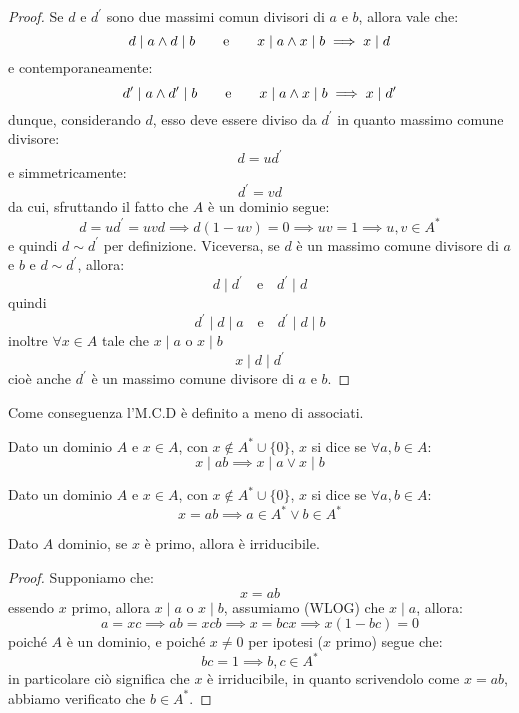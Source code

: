 \documentclass[11pt]{scrartcl}
\begin{document}
\begin{proof}
Se $d$ e $d^{\prime}$ sono due massimi comun divisori di $a$ e $b$, allora vale che:
        \[ d \mid a \land d \mid b
        \qquad
        \text e
        \qquad
        x \mid a \land x \mid b \implies x \mid d
            \]
    e contemporaneamente:
        \[ d^{\prime} \mid a \land d^{\prime} \mid b
        \qquad
        \text e
        \qquad
        x \mid a \land x \mid b \implies x \mid d^{\prime}
            \]
    dunque, considerando $d$, esso deve essere diviso da $d^{\prime}$ in quanto massimo comune divisore:
        \[ d = ud^{\prime}
            \]
    e simmetricamente:
        \[ d^{\prime} = vd
            \]
    da cui, sfruttando il fatto che $A$ è un dominio segue:
        \[ d = ud^{\prime} = uvd \implies d(1-uv) = 0 \implies uv = 1 \implies u,v \in A^*
            \]
    e quindi $d \sim d^{\prime}$ per definizione.
    Viceversa, se $d$ è un massimo comune divisore di $a$ e $b$ e $d \sim d^{\prime}$, allora:
    	\[ d \mid d^{\prime} \quad \text{e} \quad d^{\prime} \mid d
   	    \]
    quindi
    	\[ d^{\prime} \mid d \mid a \quad \text{e} \quad d^{\prime} \mid d \mid b
   	    \]
    inoltre $\forall x \in A$ tale che $x \mid a$ o $x \mid b$
    	\[ x \mid d \mid d^{\prime}
   	    \]
    cioè anche $d^{\prime}$ è un massimo comune divisore di $a$ e $b$.
\end{proof}

Come conseguenza l'M.C.D è definito a meno di associati.

\begin{definition}
    Dato un dominio $A$ e $x\in A$, con $x \not\in A^* \cup \{0\}$, $x$ si dice  se $\forall a,b \in A$:
    \[ x \mid ab \implies x \mid a \vee x \mid b
        \]
\end{definition}

\begin{definition}
    Dato un dominio $A$ e $x\in A$, con $x \not\in A^* \cup \{0\}$, $x$ si dice  se $\forall a,b \in A$:
    \[ x = ab \implies a \in A^* \vee b \in A^*
        \]
\end{definition}

\begin{proposition}
    \label{2.58}
    Dato $A$ dominio, se $x$ è primo, allora è irriducibile.
\end{proposition}

\begin{proof}
    Supponiamo che:
    \[ x = ab
        \]
    essendo $x$ primo, allora $x \mid a$ o $x \mid b$, assumiamo (WLOG) che $x \mid a$, allora:
    \[ a = xc \implies ab = xcb \implies x = bcx \implies x(1-bc) = 0
        \]
    poiché $A$ è un dominio, e poiché $x \ne 0$ per ipotesi ($x$ primo) segue che:
    \[ bc = 1 \implies b,c \in A^*
        \]
    in particolare ciò significa che $x$ è irriducibile, in quanto scrivendolo come $x = ab$, abbiamo verificato che $b \in A^*$.
\end{proof}
\end{document}
